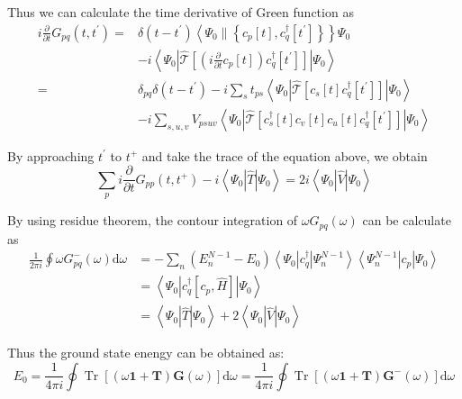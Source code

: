 Thus we can calculate the time derivative of Green function as
\begin{equation}
\begin{aligned} i \frac{\partial}{\partial t} G_{p q}\left(t, t^{\prime}\right)=& \delta\left(t-t^{\prime}\right)\left\langle\Psi_{0} \|\left\{c_{p}[t], c_{q}^{\dagger}\left[t^{\prime}\right]\right\}\right\} \Psi_{0} \\ &-i\left\langle\Psi_{0}\left|\hat{\mathcal{T}}\left[\left(i \frac{\partial}{\partial t} c_{p}[t]\right) c_{q}^{\dagger}\left[t^{\prime}\right]\right]\right| \Psi_{0}\right\rangle \\=& \delta_{p q} \delta\left(t-t^{\prime}\right)-i \sum_{s} t_{p s}\left\langle\Psi_{0}\left|\hat{\mathcal{T}}\left[c_{s}[t] c_{q}^{\dagger}\left[t^{\prime}\right]\right]\right| \Psi_{0}\right\rangle \\ &- i \sum_{s, u, v} V_{p s u v}\left\langle\Psi_{0}\left|\hat{\mathcal{T}}\left[c_{s}^{\dagger}[t] c_{v}[t] c_{u}[t] c_{q}^{\dagger}\left[t^{\prime}\right]\right]\right| \Psi_{0}\right\rangle \end{aligned}
\end{equation}

By approaching $t^{\prime}$ to $t^{+}$ and take the trace of the equation above, we obtain
\begin{equation}
\sum_{p} i \frac{\partial}{\partial t} G_{p p}\left(t, t^{+}\right)-i\left\langle\Psi_{0}|\hat{T}| \Psi_{0}\right\rangle= 2 i\left\langle\Psi_{0}|\hat{V}| \Psi_{0}\right\rangle
\end{equation}

By using residue theorem, the contour integration of $\omega G_{pq}(\omega)$ can be calculate as
\begin{equation}
\begin{aligned}
	\frac{1}{2 \pi i} \oint \omega G_{p q}^{-}(\omega) \mathrm{d} \omega
	&=-\sum_{n}\left(E_{n}^{N-1}-E_{0}\right)\left\langle\Psi_{0}\left|c_{q}^{\dagger}\right| \Psi_{n}^{N-1}\right\rangle\left\langle\Psi_{n}^{N-1}\left|c_{p}\right| \Psi_{0}\right\rangle
\\ 
&=\left\langle\Psi_{0}\left|c_{q}^{\dagger}\left[c_{p}, \hat{H}\right]\right| \Psi_{0}\right\rangle
\\
	&=\left\langle\Psi_{0}|\hat{T}| \Psi_{0}\right\rangle+ 2\left\langle\Psi_{0}|\hat{V}| \Psi_{0}\right\rangle
\end{aligned}
\end{equation}

Thus the ground state enengy can be obtained as:
\begin{equation} \label{greenenergy}
E_{0}=\frac{1}{4 \pi i} \oint \operatorname{Tr}[(\omega \mathbf{1}+\boldsymbol{T}) \boldsymbol{G}(\omega)] \mathrm{d} \omega=\frac{1}{4 \pi i} \oint \operatorname{Tr}\left[(\omega \mathbf{1}+\boldsymbol{T}) \boldsymbol{G}^{-}(\omega)\right] \mathrm{d} \omega
\end{equation}

